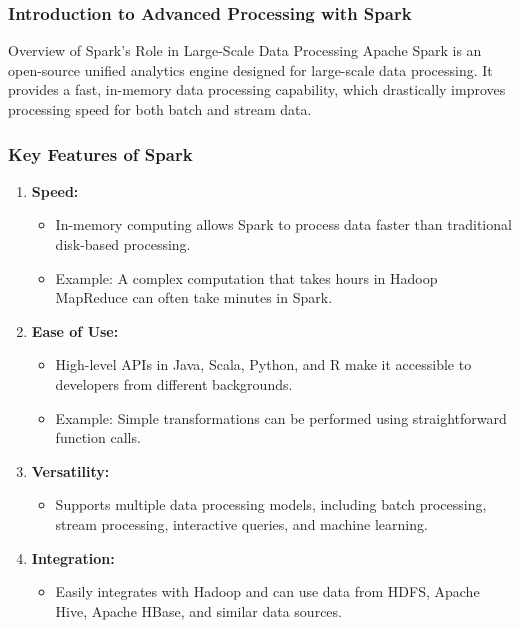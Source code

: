 \documentclass[aspectratio=169]{beamer}
\begin{document}
\frame{\titlepage}

\begin{frame}[fragile]
    \frametitle{Introduction to Advanced Processing with Spark}
    \begin{block}{Overview of Spark's Role in Large-Scale Data Processing}
        Apache Spark is an open-source unified analytics engine designed for large-scale data processing. 
        It provides a fast, in-memory data processing capability, which drastically improves processing speed for both batch and stream data.
    \end{block}
\end{frame}

\begin{frame}[fragile]
    \frametitle{Key Features of Spark}
    \begin{enumerate}
        \item \textbf{Speed:}
            \begin{itemize}
                \item In-memory computing allows Spark to process data faster than traditional disk-based processing. 
                \item Example: A complex computation that takes hours in Hadoop MapReduce can often take minutes in Spark.
            \end{itemize}
        \item \textbf{Ease of Use:}
            \begin{itemize}
                \item High-level APIs in Java, Scala, Python, and R make it accessible to developers from different backgrounds.
                \item Example: Simple transformations can be performed using straightforward function calls.
            \end{itemize}
        \item \textbf{Versatility:}
            \begin{itemize}
                \item Supports multiple data processing models, including batch processing, stream processing, interactive queries, and machine learning.
            \end{itemize}
        \item \textbf{Integration:}
            \begin{itemize}
                \item Easily integrates with Hadoop and can use data from HDFS, Apache Hive, Apache HBase, and similar data sources.
            \end{itemize}
    \end{enumerate}
\end{frame}
\end{document}
